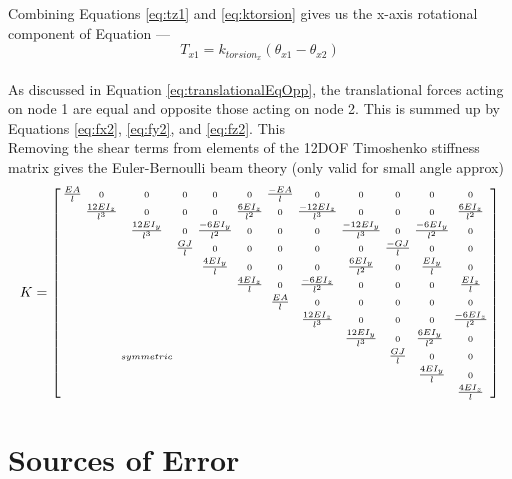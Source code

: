 {Combining Equations \ref{eq:tz1} and \ref{eq:ktorsion} gives us the x-axis rotational component of Equation ---
\[T_{x1} =  k_{torsion_x}(\theta_{x1} - \theta_{x2}) \]\\

As discussed in Equation \ref{eq:translationalEqOpp}, the translational forces acting on node 1 are equal and opposite those acting on node 2.  This is summed up by Equations \ref{eq:fx2}, \ref{eq:fy2}, and \ref{eq:fz2}.  This \\

Removing the shear terms from elements of the 12DOF Timoshenko stiffness matrix gives the Euler-Bernoulli beam theory (only valid for small angle approx)\\


\[ K =  \small {\left[ \begin{smallmatrix}
\tfrac{EA}{l} & 0 & 0 & 0 & 0 & 0 & \tfrac{-EA}{l} & 0 & 0 & 0 & 0 & 0\\
 & \tfrac{12EI_z}{l^3} & 0 & 0 & 0 & \tfrac{6EI_z}{l^2} & 0 & \tfrac{-12EI_z}{l^3} & 0 & 0 & 0 & \tfrac{6EI_z}{l^2}\\
 &  & \tfrac{12EI_y}{l^3} & 0 & \tfrac{-6EI_y}{l^2} & 0 & 0 & 0 & \tfrac{-12EI_y}{l^3} & 0 & \tfrac{-6EI_y}{l^2} & 0\\
 &  &  &  \tfrac{GJ}{l} &  0 &  0 &  0 &  0 &  0 & \tfrac{-GJ}{l} & 0 & 0\\
 &  &  &  & \tfrac{4EI_y}{l} & 0 & 0 & 0 & \tfrac{6EI_y}{l^2} & 0 & \tfrac{EI_y}{l} & 0\\
 &  &  &  &  & \tfrac{4EI_z}{l} & 0 & \tfrac{-6EI_z}{l^2} & 0 & 0 & 0 & \tfrac{EI_z}{l}\\
 &  &  &  &  &  & \tfrac{EA}{l}  & 0 & 0 & 0 & 0 & 0\\
 &  &  &  &  &  &  & \tfrac{12EI_z}{l^3} & 0 & 0 & 0 & \tfrac{-6EI_z}{l^2}\\
 &  &  &  &  &  &  &  & \tfrac{12EI_y}{l^3} & 0 & \tfrac{6EI_y}{l^2}\ & 0\\
 &  & symmetric &  &  &  &  &  &  & \tfrac{GJ}{l} & 0 & 0\\
 &  &  &  &  &  &  &  &  &  & \tfrac{4EI_y}{l} & 0\\
  &  &  &  &  &  &  &  &  &  &  & \tfrac{4EI_z}{l}\\
 \end{smallmatrix} \right] } \]

\section{Sources of Error}

}

